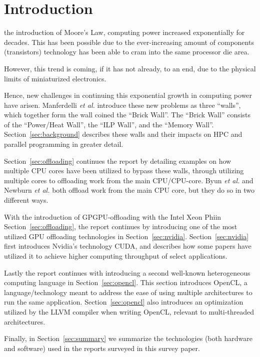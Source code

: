 
\section{Introduction}
\label{sec:intro}

 the introduction of Moore's Law\cite{Moore:2000:CMC:333067.333074}, computing power increased exponentially for decades.
This has been possible due to the ever-increasing amount of components (transistors) technology has been able to cram into the same processor die area.

However, this trend is coming, if it has not already, to an end, due to the physical limits of miniaturized electronics.

Hence, new challenges in continuing this exponential growth in computing power have arisen.
Manferdelli \textit{et al.}\cite{4484943} introduce these new problems as three ``walls'', which together form the wall coined the ``Brick Wall''.
The ``Brick Wall'' consists of the ``Power/Heat Wall'', the ``ILP Wall'', and the ``Memory Wall''.
Section~\ref{sec:background} describes these walls and their impacts on HPC and parallel programming in greater detail.

Section~\ref{sec:offloading} continues the report by detailing examples on how multiple CPU cores have been utilized to bypass these walls, through utilizing multiple cores to offloading work from the main CPU/CPU-core.
Byun \textit{et al.}\cite{Byun:EECS-2012-215} and Newburn \textit{et al.}\cite{Newburn:2013:OCR:2510648.2511038} both offload work from the main CPU core, but they do so in two different ways.

With the introduction of GPGPU-offloading with the Intel Xeon Phi\texttrademark in Section~\ref{sec:offloading}, the report continues by introducing one of the most utilized GPU offloading technologies in Section~\ref{sec:nvidia}.
Section~\ref{sec:nvidia} first introduces Nvidia's technology CUDA\texttrademark, and describes how some papers have utilized it to achieve higher computing throughput of select applications.

Lastly the report continues with introducing a second well-known heterogeneous computing language in Section~\ref{sec:opencl}.
This section introduces OpenCL\texttrademark, a language/technology meant to address the ease of using multiple architectures to run the same application.
Section~\ref{sec:opencl} also introduces an optimization utilized by the LLVM compiler when writing OpenCL, relevant to multi-threaded architectures.

Finally, in Section~\ref{sec:summary} we summarize the technologies (both hardware and software) used in the reports surveyed in this survey paper.

